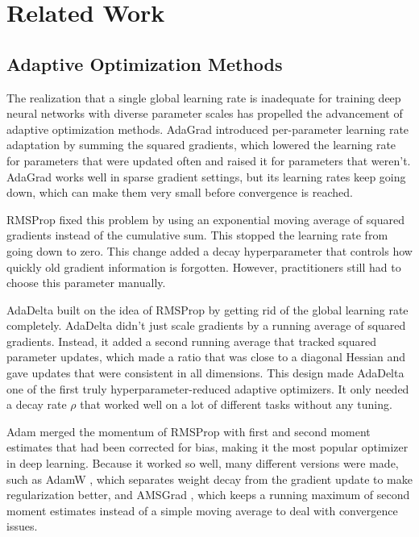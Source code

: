 \documentclass[11pt,a4paper]{article}
\begin{document}
\section{Related Work}
\label{sec:related}

\subsection{Adaptive Optimization Methods}

The realization that a single global learning rate is inadequate for training deep neural networks with diverse parameter scales has propelled the advancement of adaptive optimization methods. AdaGrad \citep{duchi2011adagrad} introduced per-parameter learning rate adaptation by summing the squared gradients, which lowered the learning rate for parameters that were updated often and raised it for parameters that weren't. AdaGrad works well in sparse gradient settings, but its learning rates keep going down, which can make them very small before convergence is reached.

RMSProp \citep{tieleman2012rmsprop} fixed this problem by using an exponential moving average of squared gradients instead of the cumulative sum. This stopped the learning rate from going down to zero. This change added a decay hyperparameter that controls how quickly old gradient information is forgotten. However, practitioners still had to choose this parameter manually.

AdaDelta \citep{zeiler2012adadelta} built on the idea of RMSProp by getting rid of the global learning rate completely. AdaDelta didn't just scale gradients by a running average of squared gradients. Instead, it added a second running average that tracked squared parameter updates, which made a ratio that was close to a diagonal Hessian and gave updates that were consistent in all dimensions. This design made AdaDelta one of the first truly hyperparameter-reduced adaptive optimizers. It only needed a decay rate $\rho$ that worked well on a lot of different tasks without any tuning.

Adam \citep{kingma2014adam} merged the momentum of RMSProp with first and second moment estimates that had been corrected for bias, making it the most popular optimizer in deep learning. Because it worked so well, many different versions were made, such as AdamW \citep{loshchilov2017adamw}, which separates weight decay from the gradient update to make regularization better, and AMSGrad \citep{reddi2018amsgrad}, which keeps a running maximum of second moment estimates instead of a simple moving average to deal with convergence issues.
\end{document}
